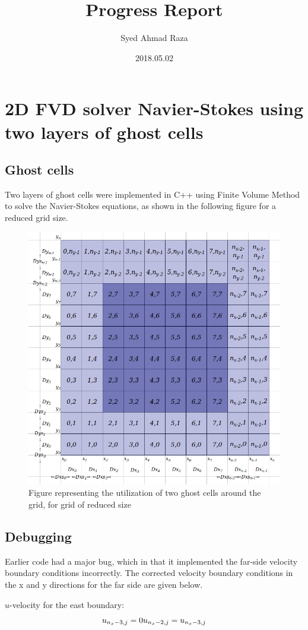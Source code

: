 \documentclass[12pt,a4paper,fleqn]{article}
\title{Progress Report}
\author{Syed Ahmad Raza}
\date{2018.05.02}
\begin{document}
\maketitle

\section{2D FVD solver Navier-Stokes using two layers of ghost cells}

\subsection{Ghost cells}
Two layers of ghost cells were implemented in C++ using Finite Volume Method to solve the Navier-Stokes equations, as shown in the following figure for a reduced grid size.

\begin{figure}[H]
    \centering
    \includegraphics[width=0.65\linewidth]{../figures/grid_overview.png}
    \caption{Figure representing the utilization of two ghost cells around the grid, for grid of reduced size}
\end{figure}

\subsection{Debugging}
Earlier code had a major bug, which  in that it implemented the far-side velocity boundary conditions incorrectly. The corrected velocity boundary conditions in the x and y directions for the far side are given below.

\(u\)-velocity for the east boundary:
\begin{equation}
u_{n_x-3,j} = 0\\
u_{n_x-2,j} = u_{n_x-3,j}
\end{equation}
\end{document}

